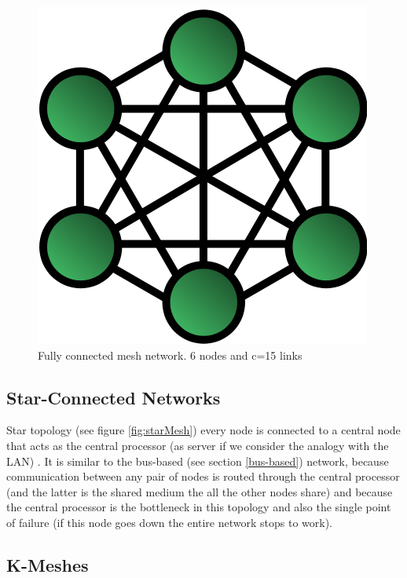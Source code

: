 \begin{figure}
\begin{center}
\includegraphics[scale=0.4]{./images/FullMesh}
\caption{Fully connected mesh network. 6 nodes and c=15 links}
\label{fig:completelyConnected}
\end{center}
\end{figure}



\subsection{Star-Connected Networks}

Star topology (see figure \ref{fig:starMesh}) every node is connected to
a central node that acts as the central processor (as server if we consider the
analogy with the LAN) . It is similar to the bus-based (see section \ref{bus-based}) network, because communication
between any pair of nodes is routed through the central processor (and the
latter is the shared medium the all the other nodes share) and because the
central processor is the bottleneck in this topology and also the single point
of failure (if this node goes down  the entire network stops to work).




\subsection{K-Meshes}


